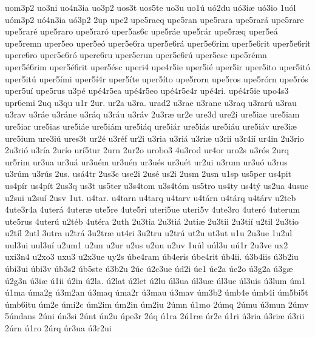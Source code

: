 {uom3p2
uo3ni
uo4n3ia
uo3p2
uos3t
uos5te
uo3u
uo1^^fa
u^^f32du
u^^f33i^^e6
u^^f33io
1u^^f3l
u^^f3m3p2
u^^f34n3ia
u^^f33p2
2up
upe2
upe5raeq
upe5ran
upe5rara
upe5rar^^e1
upe5rare
upe5rar^^e9
upe5raro
upe5rar^^f3
uper5as6c
upe5r^^e1e
upe5r^^e1r
upe5r^^e6q
uper5e^^e1
upe5remn
uper5eo
uper5e^^f3
uper5e6ra
uper5e6r^^e1
uper5e6rim
uper5e6rit
uper5e6r^^edt
upere6ro
uper5e6r^^f3
upere6ru
uper5erun
uper5e6r^^fa
uper5esc
upe5r^^e9mn
uper5^^e96rim
uper5^^e96rit
uper5^^e9sc
uperi4
upe4r5ie
uper5i^^e9
uper5ir
uper5ito
uper5it^^f3
uper5it^^fa
uper5^^edmi
uper5^^ed4r
uper5^^edte
uper5^^edto
upe5rorn
upe5ros
upe5r^^f3rn
upe5r^^f3s
uper5u^^ed
upe5rus
u3p^^e9
up^^e94r5ea
up^^e94r5eo
up^^e94r5e4r
up^^e94ri.
up^^e94r5ie
upo4s3
upr6emi
2uq
u3qu
u1r
2ur.
ur2a
u3ra.
urad2
u3rae
u3rane
u3raq
u3rar^^fa
u3rau
u3rav
u3r^^e1e
u3r^^e1ne
u3r^^e1q
u3r^^e1u
u3r^^e1v
2u3r^^e6
ur2e
ure3d
ure2i
ure5iae
ure5iam
ure5iar
ure5ias
ure5i^^e1e
ure5i^^e1m
ure5i^^e1q
ure5i^^e1r
ure5i^^e1s
ure5i^^e1u
ure5i^^e1v
ure3i^^e6
ure5ium
ure3i^^fa
ures3t
ur2^^e9
u3r^^e9f
ur2i
u3ria
u3ri^^e1
u3ri^^e6
u3rii
u3r4i^^ed
ur4in
2u3rio
2u3ri^^f3
u3r^^eda
2ur^^edo
ur^^ed5tur
2urn
2ur2o
urobo3
4u3rod
ur4or
uro2s
u3r^^f3s
2urq
ur5rim
ur3ua
ur3u^^e1
ur3u^^e9m
ur3u^^e9n
ur3u^^e9s
ur3u^^e9t
ur2ui
u3rum
ur3u^^f3
u3rus
u3r^^fam
u3r^^fas
2us.
us^^e14tr
2us3c
use2i
2us^^e9
us2i
2usm
2usn
u1sp
us5per
us4pit
us4p^^edr
us4p^^edt
2us3q
us3t
us5ter
u3s4tom
u3s4t^^f3m
us5tro
us4ty
us4t^^fd
us2ua
4usue
u2sui
u2su^^ed
2usv
1ut.
u4tar.
u4tarn
u4tarq
u4tarv
u4t^^e1rn
u4t^^e1rq
u4t^^e1rv
u2teb
4ute3r4a
4uter^^e1
4uter^^e6
ute5re
4ute5ri
uteri5ue
uteri5v
4ute3ro
4uter^^f3
4uterum
ute5rus
4uter^^fa
u2t^^e9b
4ut^^e9ra
2uth
2u3tia
2u3ti^^e1
2uti^^e6
2u3tii
2u3ti^^ed
u2til
2u3tio
u2t^^edl
2utl
3utra
u2tr^^e1
3u2tr^^e6
ut4ri
3u2tru
u2tr^^fa
ut2u
ut3ut
u1u
2u3ue
1u2ul
uul3ui
uul3u^^ed
u2um1
u2un
u2ur
u2us
u2uu
u2uv
1u^^fal
u^^fal3u
u^^fa1r
2u3ve
ux2
uxi3n4
u2xo3
uxu3
u2x3ue
uy2s
^^fabe4ram
^^fab4eris
^^fabe4rit
^^fab4ii.
^^fa3b4iis
^^fa3b2iu
^^fabi3ui
^^fabi3v
^^fab3s2
^^fab5ste
^^fa3b2u
2^^fac
^^fa2c3ue
^^fad2i
^^fae1
^^fae2a
^^fae2o
^^fa3g2a
^^fa3g^^e6
^^fa2g3n
^^fa3i^^e6
^^fa1ii
^^fa2in
^^fa2la.
^^fa2lat
^^fa2let
^^fa2lu
^^fal3ua
^^fal3u^^e6
^^fal3ue
^^fal3uis
^^fa3lum
^^fam1
^^fa1ma
^^fama2g
^^fa3m2an
^^fa3maq
^^fama2r
^^fa3mau
^^fa3mav
^^fam3b2
^^famb4e
^^famb4i
^^fam5bi5t
^^famb6itu
^^fam2e
^^fami2c
^^fam2im
^^fam2in
^^fam2iu
2^^famn
^^fa1mo
2^^famq
2^^famu
^^fa3mun
2^^famv
5^^fandans
2^^fani
^^fan3si
2^^fant
^^fan2u
^^fape3r
2^^faq
^^fa1ra
2^^fa1r^^e6
^^far2e
^^fa1ri
^^fa3ria
^^fa3ri^^e6
^^fa3rii
2^^farn
^^fa1ro
2^^farq
^^far3ua
^^fa3r2ui
}
